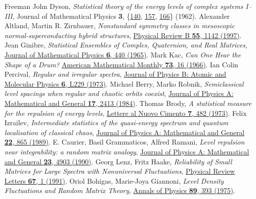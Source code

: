 \documentclass[a4paper,11pt,twoside]{article}
\begin{document}
\begin{thebibliography}{99}
     Freeman John Dyson, {\it Statistical theory of the energy levels of complex systems I--III}, Journal of Mathematical Physics {\bf 3}, \{\href{https://aip.scitation.org/doi/10.1063/1.1703773}{140}, \href{https://aip.scitation.org/doi/10.1063/1.1703774}{157}, \href{https://aip.scitation.org/doi/10.1063/1.1703775}{166}\} (1962).
     Alexander Altland, Martin R. Zirnbauer, {\it Nonstandard symmetry classes in mesoscopic normal-superconducting hybrid structures}, \href{https://journals.aps.org/prb/abstract/10.1103/PhysRevB.55.1142}{Physical Review B {\bf 55}, 1142 (1997)}.
     Jean Ginibre, {\it Statistical Ensembles of Comples, Quaternion, and Real Matrices}, \href{https://aip.scitation.org/doi/10.1063/1.1704292}{Journal of Mathematical Physics {\bf 6}, 440 (1965)}.
     Mark Kac, {\it Can One Hear the Shape of a Drum?} \href{https://www.maa.org/sites/default/files/pdf/upload_library/22/Ford/MarkKac.pdf}{American Mathematical Monthly {\bf 73}, 16 (1966)}.
     Ian Colin Percival, {\it Regular and irregular spectra}, \href{https://iopscience.iop.org/article/10.1088/0022-3700/6/9/002/pdf}{Journal of Physics B: Atomic and Molecular Physics {\bf 6}, L229 (1973)}.
     Michael Berry, Marko Robnik, {\it Semiclassical level spacings when regular and chaotic orbits coexist}, \href{https://iopscience.iop.org/article/10.1088/0305-4470/17/12/013}{Journal of Physics A: Mathematical and General {\bf 17}, 2413 (1984)}.
     Thomas Brody, {\it A statistical measure for the repulsion of energy levels}, \href{https://link.springer.com/article/10.1007/BF02727859}{Lettere al Nuovo Cimento {\bf 7}, 482 (1973)}.
     Felix Izrailev, {\it Intermediate statistics of the quasi-energy spectrum and quantum localisation of classical chaos}, \href{https://iopscience.iop.org/article/10.1088/0305-4470/22/7/017/meta}{Journal of Physics A: Mathematical and General {\bf 22}, 865 (1989)}.
     E. Caurier, Basil Grammaticos, Alfred Ramani, {\it Level repulsion near integrability: a random matrix analogy}, \href{https://iopscience.iop.org/article/10.1088/0305-4470/23/21/029}{Journal of Physics A: Mathematical and General {\bf 23}, 4903 (1990)}.
     Georg Lenz, Fritz Haake, {\it Reliability of Small Matrices for Large Spectra with Nonuniversal Fluctuations}, \href{https://journals.aps.org/prl/abstract/10.1103/PhysRevLett.67.1}{Physical Review Letters {\bf 67}, 1 (1991)}.
     Oriol Bohigas, Marie-Joya Giannoni, {\it Level Density Fluctuations and Random Matrix Theory}, \href{https://www.sciencedirect.com/science/article/abs/pii/0003491675901876}{Annals of Physics {\bf 89}, 393 (1975)}.
\end{thebibliography}
\end{document}
